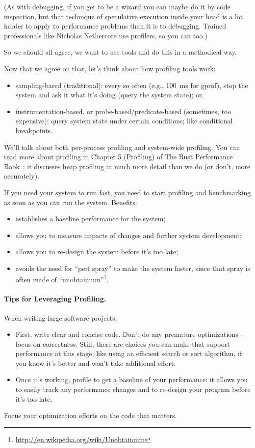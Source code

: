 (As with debugging, if you get to be a wizard you can maybe do it by code inspection, but that technique of speculative execution inside your head is a lot harder to apply to performance problems than it is to debugging. Trained professionals like Nicholas Nethercote use profilers, so you can too.)

So we should all agree, we want to use tools and do this in a methodical way.

Now that we agree on that, let's think about how profiling tools work:

\begin{itemize}[noitemsep]
\item sampling-based (traditional): every so often (e.g., 100~ms for gprof), stop the system and ask it what it's doing (query the system state); or,
\item instrumentation-based, or probe-based/predicate-based
  (sometimes, too expensive): query system state under certain
  conditions; like conditional breakpoints.
\end{itemize}
We'll talk about both per-process profiling and system-wide profiling. You can read more about profiling in Chapter 5 (Profiling) of The Rust Performance Book~\cite{nethercote20:_rust_perfor_book}; it discusses heap profiling in much more detail than we do (or don't,
more accurately).

If you need your system to run fast, you need to start profiling
and benchmarking as soon as you can run the system. Benefits:
\begin{itemize}[noitemsep]
\item establishes a baseline performance for the system;
\item allows you to measure impacts of changes and further system development;
\item allows you to re-design the system before it's too late;
\item avoids the need for ``perf spray'' to make the system faster, since
that spray is often made of ``unobtainium''\footnote{\url{http://en.wikipedia.org/wiki/Unobtainium}}.
\end{itemize}

\paragraph{Tips for Leveraging Profiling.}
When writing large software projects:
  \begin{itemize}[noitemsep]
    \item First, write clear and concise code. Don't do any premature optimizations -- focus on correctness. Still, there are choices you can make that support performance at this stage, like using an efficient search or sort algorithm, if you know it's better and won't take additional effort.
    \item Once it's working, profile to get a baseline of your performance: it allows you to easily track any performance changes and to re-design your program before it's too late.
  \end{itemize}
Focus your optimization efforts on the code that matters.

